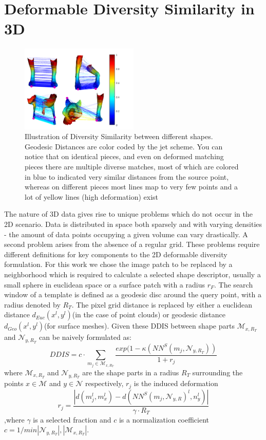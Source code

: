 \documentclass[10pt,twocolumn,letterpaper]{article}
\begin{document}
\section{Deformable Diversity Similarity in 3D}
\begin{figure}[htb]
	
	\includegraphics[width=0.5\textwidth]{figures/DDIS2.png}
	\caption{Illustration of Diversity Similarity between different shapes. 
		Geodesic Distances are color coded by the jet scheme. 
		You can notice that on identical pieces, and even on deformed matching pieces there are multiple diverse matches, most of which are colored in blue to indicated very similar distances from the source point, whereas on different pieces most lines map to very few points and a lot of yellow lines (high deformation) exist}
\end{figure}

The nature of 3D data gives rise to unique problems which do not occur in the 2D scenario. Data is distributed in space both sparsely and with varying densities - the amount of data points occupying a given volume can vary drastically.
A second problem arises from the absence of a regular grid. These problems require different definitions for key components to the 2D deformable diversity formulation. For this work we chose the image patch to be replaced by a neighborhood which is required to calculate a selected shape descriptor, usually a small sphere in euclidean space or a surface patch with a radius $r_F$. 
The search window  of a template is defined as a geodesic disc around the query point, with a radius denoted by $R_T$. The pixel grid distance is replaced by either a euclidean distance $d_{Euc}(x^l,y^l)$(in the case of point clouds) or geodesic distance $d_{Geo}(x^l,y^l)$(for surface meshes).
Given these DDIS  between shape parts $\mathcal{M}_{x,R_T}$ and $\mathcal{N}_{y,R_T}$ can be naively formulated as:
\begin{equation}
DDIS=c\cdot\sum_{m_j\in\mathcal{M}_{x,R_T}}\frac{exp(1-\kappa(NN^S(m_j,\mathcal{N}_{y,R_T}))}{1+r_j}
\end{equation}
where $\mathcal{M}_{x,R_T}$ and $\mathcal{N}_{y,R_T}$ are the shape parts in a radius $R_T$ surrounding the points $x\in \mathcal{M}$ and $y \in \mathcal{N}$ respectively, $r_j$ is the induced deformation
\begin{equation} 
r_j=\frac{|d(m_j^l,m_x^l)-d(NN^S(m_j,\mathcal{N}_{y,R})^l,n_y^l)|}{\gamma\cdot R_T}
\end{equation}
,where $\gamma$ is a selected fraction and $c$ is a normalization coefficient $c=1/min{|\mathcal{N}_{y,R_T}|,|\mathcal{M}_{x,R_T}|}$.
\end{document}
